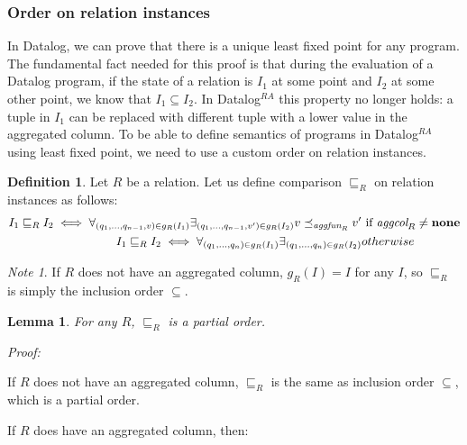 \documentclass{pracamgr}
\theoremstyle{plain}
\newtheorem{lem}[thm]{Lemma}
\theoremstyle{definition}
\newtheorem{defn}{Definition}[section]
\theoremstyle{remark}
\newtheorem*{note}{Note}
\newcommand{\datalogra}{Datalog$^{RA}$ }
\newcommand{\aggfun}{\textit{aggfun} }
\newcommand{\aggcol}{\textit{aggcol} }
\begin{document}
\subsubsection{Order on relation instances}
In Datalog, we can prove that there is a unique least fixed point for any program. The fundamental fact needed for this proof is that during the evaluation of a Datalog program, if the state of a relation is $I_1$ at some point and $I_2$ at some other point, we know that $I_1 \subseteq I_2$. In \datalogra this property no longer holds: a tuple in $I_1$ can be replaced with different tuple with a lower value in the aggregated column. To be able to define semantics of programs in \datalogra using least fixed point, we need to use a custom order on relation instances.

\begin{defn}
Let $R$ be a relation. Let us define comparison $\sqsubseteq_R$ on relation instances as follows:
\begin{align}
I_1 \sqsubseteq_R I_2 \iff \forall_{(q_1, ..., q_{n-1}, v) \in g_R(I_1)} \exists_{(q_1, ..., q_{n-1}, v') \in g_R(I_2)} v \preceq_{\aggfun_R} v' & \text{ if } \aggcol_R \ne \bf{none} \\
I_1 \sqsubseteq_R I_2 \iff \forall_{(q_1, ..., q_n) \in g_R(I_1)} \exists_{(q_1, ..., q_n) \in g_R(I_2)} & otherwise
\end{align}
\end{defn}

\begin{note}
If $R$ does not have an aggregated column, $g_R(I) = I$ for any $I$, so $\sqsubseteq_R$ is simply the inclusion order $\subseteq$. 
\end{note}

\begin{lem}
For any $R$, $\sqsubseteq_R$ is a partial order.
\end{lem}

\emph{Proof:}

If $R$ does not have an aggregated column, $\sqsubseteq_R$ is the same as inclusion order $\subseteq$, which is a partial order.

If $R$ does have an aggregated column, then:
\end{document}

